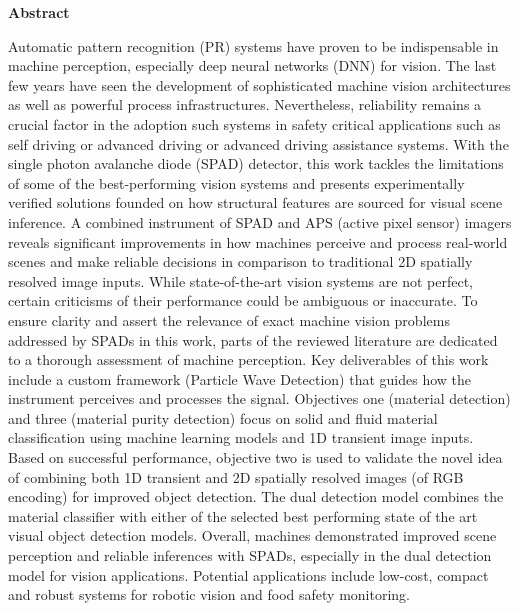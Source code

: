 \documentclass[12pt,a4paper,oneside]{report}
\begin{document}
{\fontsize{12pt}{18pt}\selectfont
{\fontsize{14pt}{21pt}\selectfont\textbf{Abstract}}

\vspace{0.2cm}
Automatic pattern recognition (PR) systems have proven to be indispensable in machine perception, especially deep neural networks (DNN) for vision. The last few years have seen the development of sophisticated machine vision architectures as well as powerful process infrastructures. Nevertheless, reliability remains a crucial factor in the adoption such systems in safety critical applications such as self driving or advanced driving or advanced driving assistance systems. With the single photon avalanche diode (SPAD) detector, this work tackles the limitations of some of the best-performing vision systems and presents experimentally verified solutions founded on how structural features are sourced for visual scene inference. A combined instrument of SPAD and APS (active pixel sensor) imagers reveals significant improvements in how machines perceive and process real-world scenes and make reliable decisions in comparison to traditional \textnormal{2D} spatially resolved image inputs. While state-of-the-art vision systems are not perfect, certain criticisms of their performance could be ambiguous or inaccurate. To ensure clarity and assert the relevance of exact machine vision problems addressed by SPADs in this work, parts of the reviewed literature are dedicated to a thorough assessment of machine perception. Key deliverables of this work include a custom framework (Particle Wave Detection) that guides how the instrument perceives and processes the signal. Objectives one (material detection) and three (material purity detection) focus on solid and fluid material classification using machine learning models and \textnormal{1D} transient image inputs. Based on successful performance, objective two is used to validate the novel idea of combining both \textnormal{1D} transient and \textnormal{2D} spatially resolved images (of RGB encoding) for improved object detection. The dual detection model combines the material classifier with either of the selected best performing state of the art visual object detection models. Overall, machines demonstrated improved scene perception and reliable inferences with SPADs, especially in the dual detection model for vision applications. Potential applications include low-cost, compact and robust systems for robotic vision and food safety monitoring.
}
\vspace*{\fill}
\newpage
\end{document}
